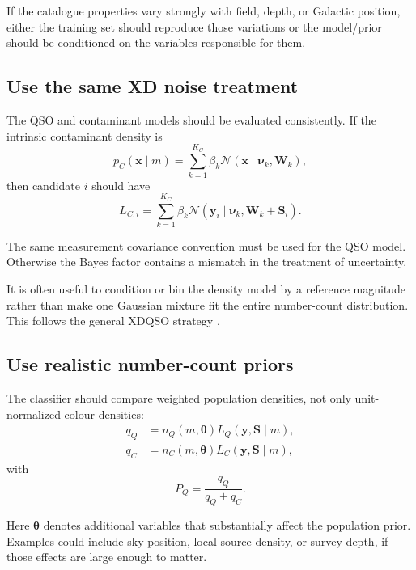 \documentclass[11pt]{article}
\begin{document}
If the catalogue properties vary strongly with field, depth, or Galactic
position, either the training set should reproduce those variations or the
model/prior should be conditioned on the variables responsible for them.

\subsection{Use the same XD noise treatment}

The QSO and contaminant models should be evaluated consistently. If the
intrinsic contaminant density is
%
\begin{equation}
p_C(\bm{x}\mid m)
=
\sum_{k=1}^{K_C}
\beta_k
\mathcal{N}
\left(
\bm{x}\mid
\bm{\nu}_k,
\bm{W}_k
\right),
\end{equation}
%
then candidate $i$ should have
%
\begin{equation}
L_{C,i}
=
\sum_{k=1}^{K_C}
\beta_k
\mathcal{N}
\left(
\bm{y}_i\mid
\bm{\nu}_k,
\bm{W}_k+\bm{S}_i
\right).
\end{equation}

The same measurement covariance convention must be used for the QSO model.
Otherwise the Bayes factor contains a mismatch in the treatment of
uncertainty.

It is often useful to condition or bin the density model by a reference
magnitude rather than make one Gaussian mixture fit the entire number-count
distribution. This follows the general XDQSO strategy
\citep{bovy2011xdqso}.

\subsection{Use realistic number-count priors}

The classifier should compare weighted population densities, not only
unit-normalized colour densities:
%
\begin{align}
q_Q &= n_Q(m,\bm{\theta}) L_Q(\bm{y},\bm{S}\mid m),\\
q_C &= n_C(m,\bm{\theta}) L_C(\bm{y},\bm{S}\mid m),
\end{align}
%
with
%
\begin{equation}
P_Q=\frac{q_Q}{q_Q+q_C}.
\end{equation}

Here $\bm{\theta}$ denotes additional variables that substantially affect the
population prior. Examples could include sky position, local source density,
or survey depth, if those effects are large enough to matter.
\end{document}
